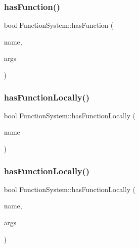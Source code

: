 \subsubsection{\texorpdfstring{has\+Function()}{hasFunction()}\hspace{0.1cm}{\footnotesize\ttfamily [2/2]}}
{\footnotesize\ttfamily bool Function\+System\+::has\+Function (\begin{DoxyParamCaption}\item[{std\+::string}]{name,  }\item[{std\+::vector$<$ \hyperlink{classVarType}{Var\+Type} $>$}]{args }\end{DoxyParamCaption})}

\mbox{\label{classFunctionSystem_a5bb3f64848489ff7cc4c982c08a10eaa}} 
\subsubsection{\texorpdfstring{has\+Function\+Locally()}{hasFunctionLocally()}\hspace{0.1cm}{\footnotesize\ttfamily [1/2]}}
{\footnotesize\ttfamily bool Function\+System\+::has\+Function\+Locally (\begin{DoxyParamCaption}\item[{std\+::string}]{name }\end{DoxyParamCaption})}

\mbox{\label{classFunctionSystem_ac4d0a40304cfb5e34db9dd47057e06d2}} 
\subsubsection{\texorpdfstring{has\+Function\+Locally()}{hasFunctionLocally()}\hspace{0.1cm}{\footnotesize\ttfamily [2/2]}}
{\footnotesize\ttfamily bool Function\+System\+::has\+Function\+Locally (\begin{DoxyParamCaption}\item[{std\+::string}]{name,  }\item[{std\+::vector$<$ \hyperlink{classVarType}{Var\+Type} $>$}]{args }\end{DoxyParamCaption})}

